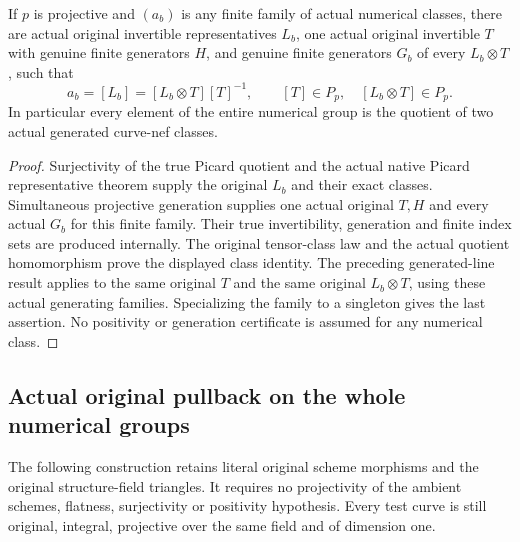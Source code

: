 \begin{theorem}
\label{thm:seven-native-common-generated-nef-representatives}
\leanok
{}
If $p$ is projective and $(a_b)$ is any finite family of actual numerical
classes, there are actual original invertible representatives $L_b$, one
actual original invertible $T$ with genuine finite generators $H$, and
genuine finite generators $G_b$ of every $L_b\otimes T$, such that
\[
 a_b=[L_b]=[L_b\otimes T][T]^{-1},\qquad
 [T]\in P_p,\quad [L_b\otimes T]\in P_p.
\]
In particular every element of the entire numerical group is the quotient
of two actual generated curve-nef classes.
\end{theorem}
\begin{proof}
Surjectivity of the true Picard quotient and the actual native Picard
representative theorem supply the original $L_b$ and their exact classes.
Simultaneous projective generation supplies one actual original $T,H$
and every actual $G_b$ for this finite family. Their true invertibility,
generation and finite index sets are produced internally. The original
tensor-class law and the actual quotient homomorphism prove the displayed
class identity. The preceding generated-line result applies to the same
original $T$ and the same original $L_b\otimes T$, using these actual
generating families. Specializing the family to a singleton gives the
last assertion. No positivity or generation certificate is assumed for
any numerical class.
\end{proof}

\subsection{Actual original pullback on the whole numerical groups}
The following construction retains literal original scheme morphisms and
the original structure-field triangles. It requires no projectivity of
the ambient schemes, flatness, surjectivity or positivity hypothesis.
Every test curve is still original, integral, projective over the same
field and of dimension one.

